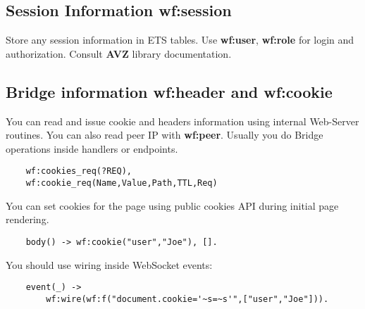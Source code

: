 \subsection{Session Information {\bf wf:session}}
Store any session information in ETS tables. Use {\bf wf:user}, {\bf wf:role} for
login and authorization. Consult {\bf AVZ} library documentation.

\newpage
\subsection{Bridge information {\bf wf:header} and {\bf wf:cookie}}
You can read and issue cookie and headers information using internal Web-Server routines.
You can also read peer IP with {\bf wf:peer}. Usually you do Bridge operations
inside handlers or endpoints.

\begin{lstlisting}
    wf:cookies_req(?REQ),
    wf:cookie_req(Name,Value,Path,TTL,Req)
\end{lstlisting}

You can set cookies for the page using public cookies API during initial page rendering.

\begin{lstlisting}
    body() -> wf:cookie("user","Joe"), [].
\end{lstlisting}

You should use wiring inside WebSocket events:

\begin{lstlisting}
    event(_) ->
        wf:wire(wf:f("document.cookie='~s=~s'",["user","Joe"])).
\end{lstlisting}
